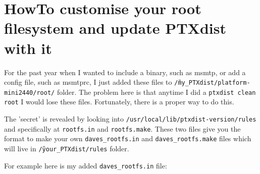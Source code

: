 %
%
%
%
%
%
%

\section{HowTo customise your root filesystem and update PTXdist with it}

For the past year when I wanted to include a binary, such as msmtp, or add a
config file, such as msmtprc, I just added these files to
\texttt{\~/my\_PTXdist/platform-mini2440/root/} folder. The problem here is that
anytime I did a \texttt{ptxdist clean root} I would lose these files.
Fortunately, there is a proper way to do this.

The 'secret' is revealed by looking into \texttt{/usr/local/lib/ptxdist-version/rules}
and specifically at \texttt{rootfs.in} and \texttt{rootfs.make}. These two
files give you the format to make your own \texttt{daves\_rootfs.in} and
\texttt{daves\_rootfs.make} files which will live in \texttt{\~/your\_PTXdist/rules}
folder.

For example here is my added \texttt{daves\_rootfs.in} file:


